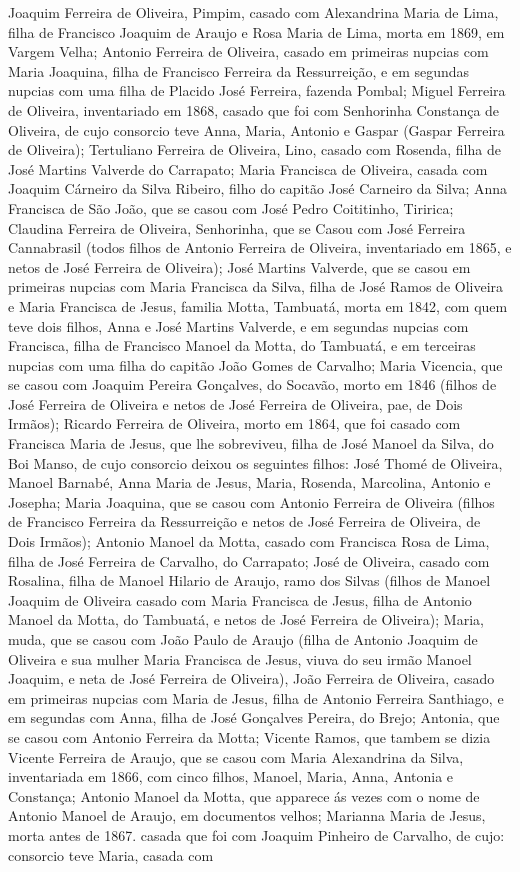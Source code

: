 Joaquim Ferreira de Oliveira, Pimpim, casado com Alexandrina Maria de Lima, filha de Francisco Joaquim de Araujo e Rosa Maria de Lima, morta em 1869, em Vargem Velha; Antonio Ferreira de Oliveira, casado em primeiras nupcias com Maria Joaquina, filha de Francisco Ferreira da Ressurreição, e em segundas nupcias com uma filha de Placido José Ferreira, fazenda Pombal; Miguel Ferreira de Oliveira, inventariado em 1868, casado que foi com Senhorinha Constança de Oliveira, de cujo consorcio teve Anna, Maria, Antonio e Gaspar (Gaspar Ferreira de Oliveira); Tertuliano Ferreira de Oliveira, Lino, casado com  Rosenda, filha de José Martins Valverde do Carrapato; Maria Francisca de Oliveira, casada com Joaquim Cárneiro da Silva Ribeiro, filho do capitão José Carneiro da Silva; Anna Francisca de São João, que se casou com José Pedro Coititinho, Tiririca; Claudina Ferreira de Oliveira, Senhorinha, que se Casou com José Ferreira Cannabrasil (todos filhos de Antonio Ferreira de Oliveira, inventariado em 1865, e netos de José Ferreira de Oliveira); José Martins Valverde, que se casou em primeiras nupcias com Maria Francisca da Silva, filha de José Ramos de Oliveira e Maria Francisca de Jesus, familia Motta, Tambuatá, morta em 1842, com quem teve dois filhos, Anna e José Martins Valverde, e em segundas nupcias com Francisca, filha de Francisco Manoel da Motta, do Tambuatá, e em terceiras nupcias com uma filha do capitão João Gomes de Carvalho; Maria Vicencia, que se casou com Joaquim Pereira Gonçalves, do Socavão, morto em 1846 (filhos de José Ferreira de Oliveira e netos de José Ferreira de Oliveira, pae, de Dois Irmãos); Ricardo Ferreira de Oliveira, morto em 1864, que foi casado com Francisca Maria de Jesus, que lhe sobreviveu, filha de José Manoel da Silva, do Boi Manso, de cujo consorcio deixou os seguintes filhos: José Thomé de Oliveira, Manoel Barnabé, Anna Maria de Jesus, Maria, Rosenda, Marcolina, Antonio e Josepha; Maria Joaquina, que se casou com Antonio Ferreira de Oliveira (filhos de Francisco Ferreira da Ressurreição e netos de José Ferreira de Oliveira, de Dois Irmãos); Antonio Manoel da Motta, casado com Francisca Rosa de Lima, filha de José Ferreira de Carvalho, do Carrapato; José de Oliveira, casado com Rosalina, filha de Manoel Hilario de Araujo, ramo dos Silvas (filhos de Manoel Joaquim de Oliveira casado com Maria Francisca de Jesus, filha de Antonio Manoel da Motta, do Tambuatá, e netos de José Ferreira de Oliveira); Maria, muda, que se casou com João Paulo de Araujo (filha de Antonio Joaquim de Oliveira e sua mulher Maria Francisca de Jesus, viuva do seu irmão Manoel Joaquim, e neta de José Ferreira de Oliveira), João Ferreira de Oliveira, casado em primeiras nupcias com Maria de Jesus, filha de Antonio Ferreira Santhiago, e em segundas com Anna, filha de José Gonçalves Pereira, do Brejo; Antonia, que se casou com Antonio Ferreira da Motta; Vicente Ramos, que tambem se dizia Vicente Ferreira de Araujo, que se casou com Maria Alexandrina da Silva, inventariada em 1866, com cinco filhos, Manoel, Maria, Anna, Antonia e Constança; Antonio Manoel da Motta, que apparece ás vezes com o nome de Antonio Manoel de Araujo, em documentos velhos; Marianna Maria de Jesus, morta antes de 1867. casada que foi com Joaquim Pinheiro de Carvalho, de cujo: consorcio teve Maria, casada com 
